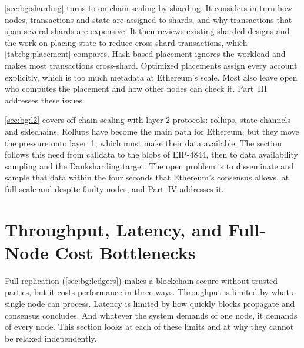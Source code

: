 \autoref{sec:bg:sharding} turns to on-chain scaling by sharding.
It considers in turn how nodes, transactions and state are assigned to shards, and why transactions that span several shards are expensive.
It then reviews existing sharded designs and the work on placing state to reduce cross-shard transactions, which \autoref{tab:bg:placement} compares.
Hash-based placement ignores the workload and makes most transactions cross-shard.
Optimized placements assign every account explicitly, which is too much metadata at Ethereum's scale.
Most also leave open who computes the placement and how other nodes can check it.
Part~III addresses these issues.

\autoref{sec:bg:l2} covers off-chain scaling with layer-2 protocols: rollups, state channels and sidechains.
Rollups have become the main path for Ethereum, but they move the pressure onto layer~1, which must make their data available.
The section follows this need from calldata to the blobs of EIP-4844, then to data availability sampling and the Danksharding target.
The open problem is to disseminate and sample that data within the four seconds that Ethereum's consensus allows, at full scale and despite faulty nodes, and Part~IV addresses it.

\section{Throughput, Latency, and Full-Node Cost Bottlenecks}\label{sec:bg:bottlenecks}


Full replication (\autoref{sec:bg:ledgers}) makes a blockchain secure without trusted parties, but it costs performance in three ways.
Throughput is limited by what a single node can process.
Latency is limited by how quickly blocks propagate and consensus concludes.
And whatever the system demands of one node, it demands of every node.
This section looks at each of these limits and at why they cannot be relaxed independently.

